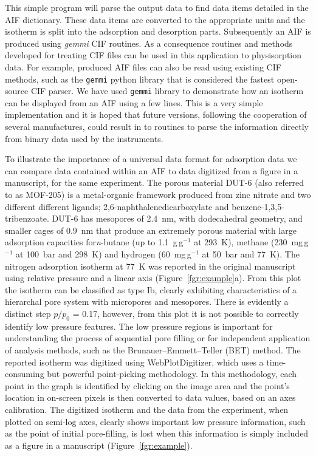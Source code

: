\documentclass[journal=langd5,manuscript=article]{achemso}
\begin{document}
This simple program will parse the output data to find data items detailed in the AIF dictionary.
These data items are converted to the appropriate units and the isotherm is split into the adsorption and desorption parts.
Subsequently an AIF is produced using \textit{gemmi} CIF routines.\cite{gemmi}
As a consequence routines and methods developed for treating CIF files can be used in this application to physisorption data.
For example, produced AIF files can also be read using existing CIF methods, such as the \texttt{gemmi} python library that is considered the fastest open-source CIF parser.\cite{gemmi}
We have used \texttt{gemmi} library to demonstrate how an isotherm can be displayed from an AIF using a few lines.
This is a very simple implementation and it is hoped that future versions, following the cooperation of several manufactures, could result in to routines to parse the information directly from binary data used by the instruments.

To illustrate the importance of a universal data format for adsorption data we can compare data contained within an AIF to data digitized from a figure in a manuscript, for the same experiment.
The porous material DUT-6 (also referred to as MOF-205) is a metal-organic framework produced from zinc nitrate and two different different ligands; 2,6-naphthalenedicarboxylate and benzene-1,3,5-tribenzoate.\cite{10.1002/anie.200904599}
DUT-6 has mesopores of 2.4~nm, with dodecahedral geometry, and smaller cages of 0.9~nm that produce an extremely porous material with large adsorption capacities for\textit{n}-butane (up to 1.1~g$\,$g$^{-1}$ at 293~K),  methane (230~mg$\,$g$^{-1}$ at 100~bar and 298~K) and hydrogen (60~mg$\,$g$^{-1}$ at 50~bar and 77~K).
The nitrogen adsorption isotherm at 77~K was reported in the original manuscript using relative pressure and a linear axis (Figure~\ref{fgr:example}a).
From this plot the isotherm can be classified  as  type  Ib, clearly exhibiting characteristics of a hierarchal pore system with micropores and mesopores.
There is evidently a distinct step $p/p_0$ = 0.17, however, from this plot it is not possible to correctly identify low pressure features.
The low pressure regions is important for understanding the process of sequential pore filling or for independent application of analysis methods, such as the Brunauer–Emmett–Teller (BET) method.\cite{10.1016/S0167-2991(07)80008-5}
The reported isotherm was digitized using WebPlotDigitizer, which uses a time-consuming but powerful point-picking methodology.\cite{webplotdigitizer}
In this methodology, each point in the graph is identified by clicking on the image area and the point's location in on-screen pixels is then converted to data values, based on an axes calibration.
The digitized isotherm and the data from the experiment, when plotted on semi-log axes, clearly shows important low pressure information, such as the point of initial pore-filling, is lost when this information is simply included as a figure in a manuscript (Figure~\ref{fgr:example}).
\end{document}
